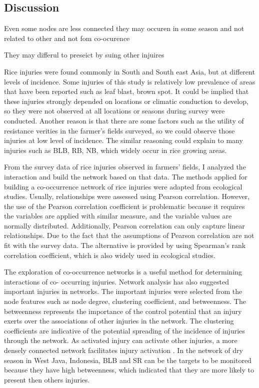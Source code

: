 \subsection{Discussion}
Even some nodes are less connected they may occuren in some season and not related to other and not fom co-ocurence

They may differul to preseict by suing other injuires 


Rice injuries were found commonly in South and South east Asia, but at different levels of incidence. 
Some injuries of this study is relatively low prevalence of areas that have been reported such as leaf blast, brown spot. It could be implied that these injuries strongly depended on locations or climatic conduction to develop, so they were not observed at all locations or seasons during survey were conducted. Another reason is that there are some factors such as the utility of resistance verities in the farmer’s fields surveyed, so we could observe those injuries at low level of incidence. The similar reasoning could explain to many injuries such as BLB, RB, NB, which widely occur in rice growing areas.

From the survey data of rice injuries observed in farmers’ fields, I analyzed the interaction and build the network based on that data. The methods applied for building a co-occurrence network of rice injuries were adapted from ecological studies. Usually, relationships were assessed using Pearson correlation. However, the use of the Pearson correlation coefficient is problematic because it requires the variables are applied with similar measure, and the variable values are normally distributed. Additionally, Pearson correlation can only capture linear relationships. Due to the fact that the assumptions of Pearson correlation are not fit with the survey data. The alternative is provided by using Spearman’s rank correlation coefficient, which is also widely used in ecological studies.

The exploration of co-occurrence networks is a useful method for determining interactions of co- occurring injuries. Network analysis has also suggested important injuries in networks. The important injuries were selected from the node features such as node degree, clustering coefficient, and betweenness. The betweenness represents the importance of the control potential that an injury exerts over the associations of other injuries in the network. The clustering coefficients are indicative of the potential spreading of the incidence of injuries through the network. As activated injury can activate other injuries, a more densely connected network facilitates injury activation \cite{Williams_2014_demonstrating}. In the network of dry season in West Java, Indonesia, BLB and SR can be the targets to be monitored because they have high betweenness, which indicated that they are more likely to present then others injuries.

